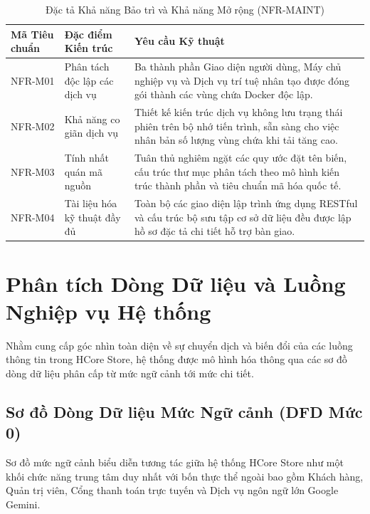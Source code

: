 \begin{table}[H]
\centering
\caption{Đặc tả Khả năng Bảo trì và Khả năng Mở rộng (NFR-MAINT)}
\label{tab:nfr_maint}
\begin{tabularx}{\textwidth}{p{2.5cm}p{4.5cm}X}
\toprule
\textbf{Mã Tiêu chuẩn} & \textbf{Đặc điểm Kiến trúc} & \textbf{Yêu cầu Kỹ thuật} \\
\midrule
NFR-M01 & Phân tách độc lập các dịch vụ & Ba thành phần Giao diện người dùng, Máy chủ nghiệp vụ và Dịch vụ trí tuệ nhân tạo được đóng gói thành các vùng chứa Docker độc lập. \\
\addlinespace
NFR-M02 & Khả năng co giãn dịch vụ & Thiết kế kiến trúc dịch vụ không lưu trạng thái phiên trên bộ nhớ tiến trình, sẵn sàng cho việc nhân bản số lượng vùng chứa khi tải tăng cao. \\
\addlinespace
NFR-M03 & Tính nhất quán mã nguồn & Tuân thủ nghiêm ngặt các quy ước đặt tên biến, cấu trúc thư mục phân tách theo mô hình kiến trúc thành phần và tiêu chuẩn mã hóa quốc tế. \\
\addlinespace
NFR-M04 & Tài liệu hóa kỹ thuật đầy đủ & Toàn bộ các giao diện lập trình ứng dụng RESTful và cấu trúc bộ sưu tập cơ sở dữ liệu đều được lập hồ sơ đặc tả chi tiết hỗ trợ bàn giao. \\
\bottomrule
\end{tabularx}
\end{table}

\section{Phân tích Dòng Dữ liệu và Luồng Nghiệp vụ Hệ thống}
Nhằm cung cấp góc nhìn toàn diện về sự chuyển dịch và biến đổi của các luồng thông tin trong HCore Store, hệ thống được mô hình hóa thông qua các sơ đồ dòng dữ liệu phân cấp từ mức ngữ cảnh tới mức chi tiết.

\subsection{Sơ đồ Dòng Dữ liệu Mức Ngữ cảnh (DFD Mức 0)}
Sơ đồ mức ngữ cảnh biểu diễn tương tác giữa hệ thống HCore Store như một khối chức năng trung tâm duy nhất với bốn thực thể ngoài bao gồm Khách hàng, Quản trị viên, Cổng thanh toán trực tuyến và Dịch vụ ngôn ngữ lớn Google Gemini.


